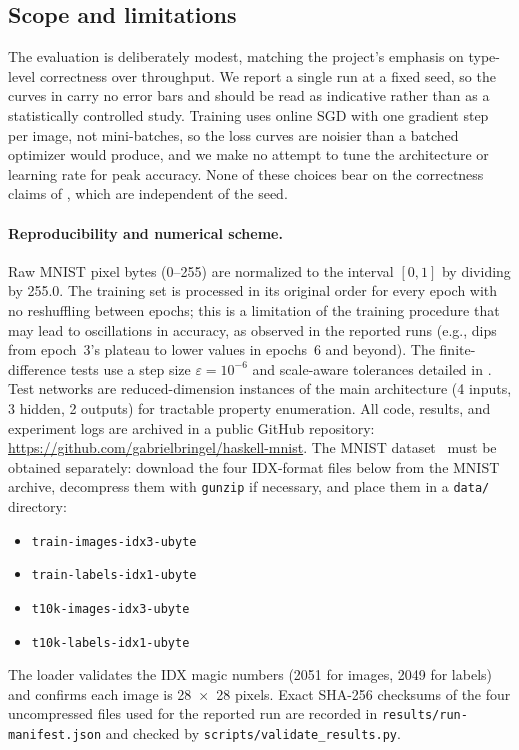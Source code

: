 \documentclass[sigconf,nonacm]{acmart}
\begin{document}
\subsection{Scope and limitations}
\label{sec:res:limits}

The evaluation is deliberately modest, matching the project's emphasis on
type-level correctness over throughput. We report a single run at a fixed seed,
so the curves in  carry no error bars and should be read as
indicative rather than as a statistically controlled study. Training uses online
SGD with one gradient step per image, not mini-batches, so the loss curves are
noisier than a batched optimizer would produce, and we make no attempt to tune
the architecture or learning rate for peak accuracy. None of these choices bear
on the correctness claims of , which are independent of the
seed.

\paragraph{Reproducibility and numerical scheme.}
Raw MNIST pixel bytes (0--255) are normalized to the interval \([0, 1]\) by
dividing by 255.0. The training set is processed in its original order for every
epoch with no reshuffling between epochs; this is a limitation of the training
procedure that may lead to oscillations in accuracy, as observed in the reported
runs (e.g., dips from epoch~3's plateau to lower values in epochs~6 and beyond).
The finite-difference tests use a step size \(\varepsilon = 10^{-6}\) and scale-aware
tolerances detailed in . Test networks are reduced-dimension
instances of the main architecture (4 inputs, 3 hidden, 2 outputs) for tractable
property enumeration. All code, results, and experiment logs are archived in a public
GitHub repository: \url{https://github.com/gabrielbringel/haskell-mnist}. The MNIST
dataset~\cite{lecun-mnist} must be obtained separately: download the four IDX-format
files below from the MNIST archive, decompress them with \texttt{gunzip} if
necessary, and place them in a \texttt{data/} directory:
\begin{itemize}
  \item \texttt{train-images-idx3-ubyte}
  \item \texttt{train-labels-idx1-ubyte}
  \item \texttt{t10k-images-idx3-ubyte}
  \item \texttt{t10k-labels-idx1-ubyte}
\end{itemize}
The loader validates the IDX magic numbers (2051 for
images, 2049 for labels) and confirms each image is 28~$\times$~28 pixels. Exact
SHA-256 checksums of the four uncompressed files used for the reported run are
recorded in \texttt{results/run-manifest.json} and checked by
\texttt{scripts/validate\_results.py}.
\end{document}

